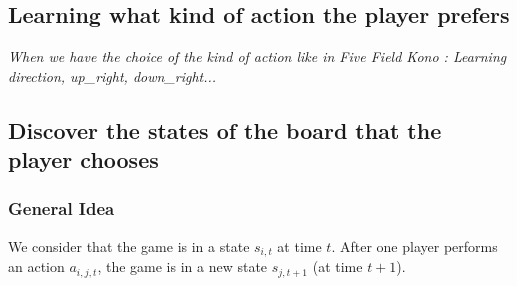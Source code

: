 \documentclass[12pt,twoside]{report}
\begin{document}
\subsection{Learning what kind of action the player prefers}

\emph{When we have the choice of the kind of action like in Five Field Kono : Learning  direction, up\_right, down\_right... }


\subsection{Discover the states of the board that the player chooses}



\subsubsection{General Idea}

We consider that the game is in a state $s_{i,t}$ at time $t$. After one player performs an action $a_{i,j,t}$, the game is in a new state $s_{j,t+1}$ (at time $t+1$).

\smallskip
\end{document}
